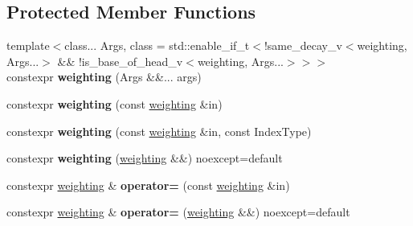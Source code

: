 \subsection*{Protected Member Functions}
\begin{DoxyCompactItemize}
\item 
\mbox{\label{classsequoia_1_1maths_1_1weighting_ae448c3393dcdf650e44d6c4b6c44f50f}} 
{\footnotesize template$<$class... Args, class  = std\+::enable\+\_\+if\+\_\+t$<$!same\+\_\+decay\+\_\+v$<$weighting, Args...$>$ \&\& !is\+\_\+base\+\_\+of\+\_\+head\+\_\+v$<$weighting, Args...$>$$>$$>$ }\\constexpr {\bfseries weighting} (Args \&\&... args)
\item 
\mbox{\label{classsequoia_1_1maths_1_1weighting_ae6e1b24a1d3a139ba4faf57154e45f51}} 
constexpr {\bfseries weighting} (const \mbox{\hyperlink{classsequoia_1_1maths_1_1weighting}{weighting}} \&in)
\item 
\mbox{\label{classsequoia_1_1maths_1_1weighting_a71da26b6c5cc78169526836d19dd07e6}} 
constexpr {\bfseries weighting} (const \mbox{\hyperlink{classsequoia_1_1maths_1_1weighting}{weighting}} \&in, const Index\+Type)
\item 
\mbox{\label{classsequoia_1_1maths_1_1weighting_a0df3376878a63ccb56032174976df17e}} 
constexpr {\bfseries weighting} (\mbox{\hyperlink{classsequoia_1_1maths_1_1weighting}{weighting}} \&\&) noexcept=default
\item 
\mbox{\label{classsequoia_1_1maths_1_1weighting_aebe21789969166044ec7f67124727553}} 
constexpr \mbox{\hyperlink{classsequoia_1_1maths_1_1weighting}{weighting}} \& {\bfseries operator=} (const \mbox{\hyperlink{classsequoia_1_1maths_1_1weighting}{weighting}} \&in)
\item 
\mbox{\label{classsequoia_1_1maths_1_1weighting_aa08fa2e70e2fad9151fb06fabb062114}} 
constexpr \mbox{\hyperlink{classsequoia_1_1maths_1_1weighting}{weighting}} \& {\bfseries operator=} (\mbox{\hyperlink{classsequoia_1_1maths_1_1weighting}{weighting}} \&\&) noexcept=default
\end{DoxyCompactItemize}


